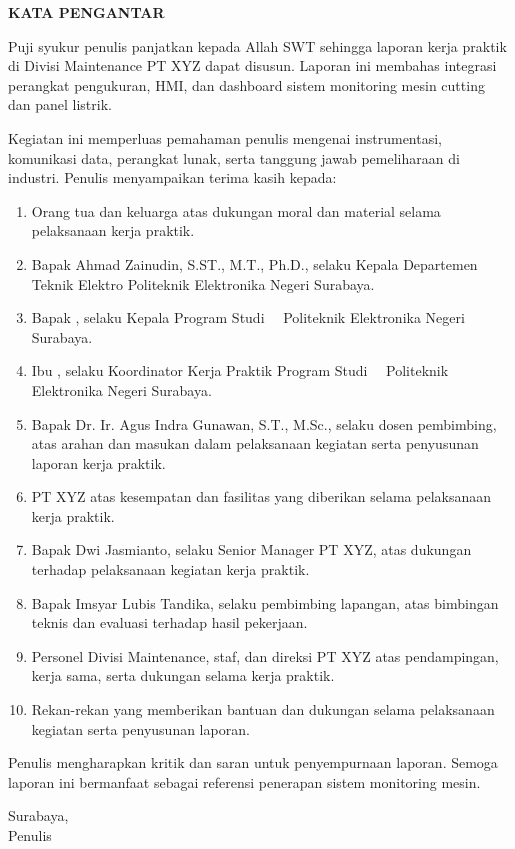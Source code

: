 \cleardoublepage
{}
{}
\begin{center}
{\FontJudulHalaman\bfseries KATA PENGANTAR\par}
\end{center}
\vspace{12pt}
Puji syukur penulis panjatkan kepada Allah SWT sehingga laporan kerja praktik di Divisi Maintenance PT XYZ dapat disusun. Laporan ini membahas integrasi perangkat pengukuran, HMI, dan dashboard sistem monitoring mesin cutting dan panel listrik.

Kegiatan ini memperluas pemahaman penulis mengenai instrumentasi, komunikasi data, perangkat lunak, serta tanggung jawab pemeliharaan di industri. Penulis menyampaikan terima kasih kepada:

\begin{enumerate}[leftmargin=*,itemsep=2pt]

\item Orang tua dan keluarga atas dukungan moral dan material selama pelaksanaan kerja praktik.

\item Bapak Ahmad Zainudin, S.ST., M.T., Ph.D., selaku Kepala Departemen Teknik Elektro Politeknik Elektronika Negeri Surabaya.

\item Bapak \NamaKetuaProdi, selaku Kepala Program Studi \JenjangProdi\ \NamaProdi\ Politeknik Elektronika Negeri Surabaya.

\item Ibu \NamaKoordinatorKP, selaku Koordinator Kerja Praktik Program Studi \JenjangProdi\ \NamaProdi\ Politeknik Elektronika Negeri Surabaya.

\item Bapak Dr. Ir. Agus Indra Gunawan, S.T., M.Sc., selaku dosen pembimbing, atas arahan dan masukan dalam pelaksanaan kegiatan serta penyusunan laporan kerja praktik.

\item PT XYZ atas kesempatan dan fasilitas yang diberikan selama pelaksanaan kerja praktik.

\item Bapak Dwi Jasmianto, selaku Senior Manager PT XYZ, atas dukungan terhadap pelaksanaan kegiatan kerja praktik.

\item Bapak Imsyar Lubis Tandika, selaku pembimbing lapangan, atas bimbingan teknis dan evaluasi terhadap hasil pekerjaan.

\item Personel Divisi Maintenance, staf, dan direksi PT XYZ atas pendampingan, kerja sama, serta dukungan selama kerja praktik.

\item Rekan-rekan yang memberikan bantuan dan dukungan selama pelaksanaan kegiatan serta penyusunan laporan.

\end{enumerate}

Penulis mengharapkan kritik dan saran untuk penyempurnaan laporan. Semoga laporan ini bermanfaat sebagai referensi penerapan sistem monitoring mesin.

\begin{flushright}Surabaya, \hspace{2.5cm}\\[12pt]Penulis\end{flushright}
